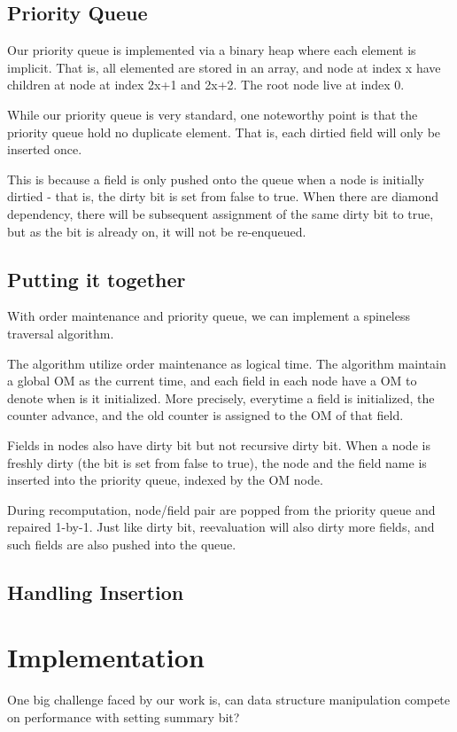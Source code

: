 \documentclass[format=acmsmall, review=false, screen=true]{acmart}
\begin{document}
\subsection{Priority Queue}
Our priority queue is implemented via a binary heap where each element is implicit. That is, all elemented are stored in an array, and node at index x have children at node at index 2x+1 and 2x+2. The root node live at index 0.

While our priority queue is very standard, one noteworthy point is that the priority queue hold no duplicate element. That is, each dirtied field will only be inserted once.

This is because a field is only pushed onto the queue when a node is initially dirtied - that is, the dirty bit is set from false to true. When there are diamond dependency, there will be subsequent assignment of the same dirty bit to true, but as the bit is already on, it will not be re-enqueued.

\subsection{Putting it together}
With order maintenance and priority queue, we can implement a spineless traversal algorithm.

The algorithm utilize order maintenance as logical time. The algorithm maintain a global OM as the current time, and each field in each node have a OM to denote when is it initialized. More precisely, everytime a field is initialized, the counter advance, and the old counter is assigned to the OM of that field.

Fields in nodes also have dirty bit but not recursive dirty bit. When a node is freshly dirty (the bit is set from false to true), the node and the field name is inserted into the priority queue, indexed by the OM node.

During recomputation, node/field pair are popped from the priority queue and repaired 1-by-1. Just like dirty bit, reevaluation will also dirty more fields, and such fields are also pushed into the queue.

\subsection{Handling Insertion}

\section{Implementation}
One big challenge faced by our work is, can data structure manipulation compete on performance with setting summary bit?
\end{document}
